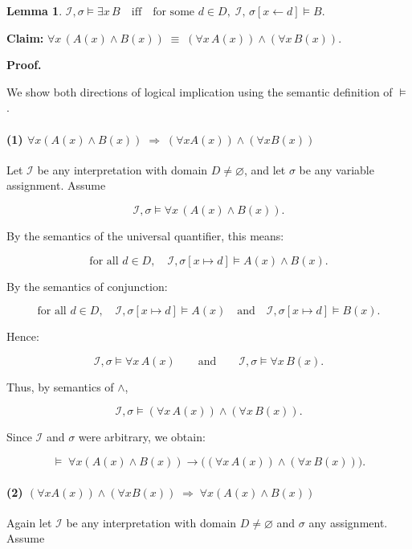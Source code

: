 \documentclass{article}
\theoremstyle{plain}
\newtheorem{lemma}{Lemma}
\theoremstyle{definition}
\theoremstyle{remark}
\begin{document}
\begin{lemma}
$\mathcal{I},\sigma \vDash \exists x\, B
\quad\text{iff}\quad
\text{for some } d \in D,\;
\mathcal{I},\, \sigma[x \leftarrow d] \vDash B.$
\end{lemma}
\bigskip
\textbf{Claim: } 
$\forall x\, (A(x)\land B(x)) \;\equiv\; (\forall x\,A(x)) \land (\forall x\,B(x)).$


\bigskip
\textbf{Proof.}

We show both directions of logical implication using the semantic definition of
\(\vDash\).

\paragraph{(1) $\forall x(A(x)\land B(x)) \;\Rightarrow\; (\forall xA(x))\land(\forall xB(x))$}

Let $\mathcal{I}$ be any interpretation with domain $D\neq\varnothing$, and let
$\sigma$ be any variable assignment.  
Assume

\[
\mathcal{I},\sigma \vDash \forall x\,(A(x)\land B(x)).
\]

By the semantics of the universal quantifier, this means:

\[
\text{for all } d\in D,\quad 
\mathcal{I},\sigma[x\mapsto d] \vDash A(x)\land B(x).
\]

By the semantics of conjunction:

\[
\text{for all } d\in D,\quad 
\mathcal{I},\sigma[x\mapsto d] \vDash A(x)
\quad\text{and}\quad
\mathcal{I},\sigma[x\mapsto d] \vDash B(x).
\]

Hence:

\[
\mathcal{I},\sigma \vDash \forall x\,A(x)
\qquad\text{and}\qquad
\mathcal{I},\sigma \vDash \forall x\,B(x).
\]

Thus, by semantics of $\land$,

\[
\mathcal{I},\sigma \vDash (\forall x\,A(x)) \land (\forall x\,B(x)).
\]

Since $\mathcal{I}$ and $\sigma$ were arbitrary, we obtain:

\[
\models\; \forall x(A(x)\land B(x)) \to 
\bigl((\forall x\,A(x))\land(\forall x\,B(x))\bigr).
\]


\paragraph{(2) $(\forall xA(x))\land(\forall xB(x)) \;\Rightarrow\; \forall x(A(x)\land B(x))$}

Again let $\mathcal{I}$ be any interpretation with domain $D\neq\varnothing$ and
$\sigma$ any assignment.  
Assume
\end{document}
